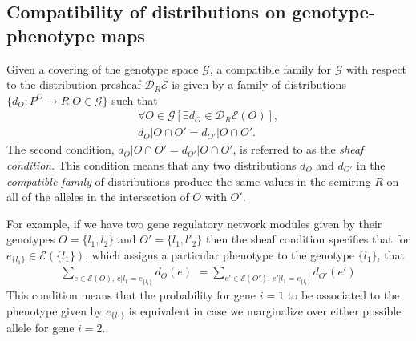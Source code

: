 \documentclass[10pt]{article}
\begin{document}
\subsection*{Compatibility of distributions on genotype-phenotype maps}
Given a covering of the genotype space $\mathcal{G}$, a compatible family for $\mathcal{G}$ with respect to the distribution presheaf $\mathcal{D}_R\mathcal{E}$ is given by a family of distributions $\{d_O \colon P^O \rightarrow R | O \in \mathcal{G}\}$ such that
\begin{eqnarray*}
\forall O \in \mathcal{G} \left[ \exists d_O \in \mathcal{D}_R\mathcal{E}(O) \right],\\
d_O|O \cap O' = d_{O'}|O \cap O'.
\end{eqnarray*}
The second condition, $d_O|O \cap O' = d_{O'}|O \cap O'$, is referred to as the \emph{sheaf condition}. This condition means that any two distributions $d_O$ and $d_{O'}$ in the \emph{compatible family} of distributions produce the same values in the semiring $R$ on all of the alleles in the intersection of $O$ with $O'$. 

For example, if we have two gene regulatory network modules given by their genotypes $O = \{l_1, l_2\}$ and $O' = \{l_1, l'_2\}$ then the sheaf condition specifies that for $e_{\{l_1\}} \in \mathcal{E}(\{l_1\})$, which assigns a particular phenotype to the genotype $\{l_1\}$, that
\begin{eqnarray}\label{eq:sheafprob}
\sum_{e \in \mathcal{E}(O),\, e|l_1=e_{\{l_1\}}} d_O(e) \,\, = \sum_{e' \in \mathcal{E}(O'),\, e'|l_1=e_{\{l_1\}}} d_{O'}(e')
\end{eqnarray}
This condition means that the probability for gene $i=1$ to be associated to the phenotype given by $e_{\{l_1\}}$ is equivalent in case we marginalize over either possible allele for gene $i=2$.
\end{document}
